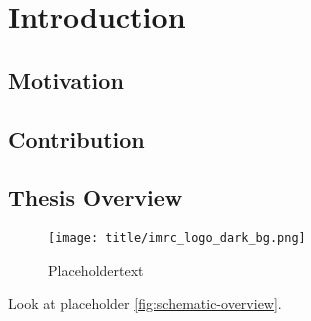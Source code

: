 \chapter{Introduction}

\section{Motivation}
\section{Contribution}
\section{Thesis Overview}
\begin{figure}
    \centering
    \texttt{[image: title/imrc\_logo\_dark\_bg.png]}
    \caption{Placeholdertext}
    \label{fig:schematic-overview}
\end{figure}
Look at placeholder \autoref{fig:schematic-overview}.